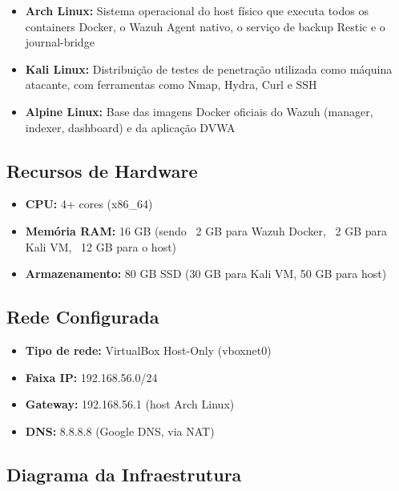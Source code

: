 \documentclass[12pt,a4paper]{article}
\begin{document}
    \begin{itemize}
        \item \textbf{Arch Linux:} Sistema operacional do host físico que executa todos os containers Docker, o Wazuh Agent nativo, o serviço de backup Restic e o journal-bridge
        \item \textbf{Kali Linux:} Distribuição de testes de penetração utilizada como máquina atacante, com ferramentas como Nmap, Hydra, Curl e SSH
        \item \textbf{Alpine Linux:} Base das imagens Docker oficiais do Wazuh (manager, indexer, dashboard) e da aplicação DVWA
    \end{itemize}

    \subsection{Recursos de Hardware}

    \begin{itemize}
        \item \textbf{CPU:} 4+ cores (x86\_64)
        \item \textbf{Memória RAM:} 16 GB (sendo ~2 GB para Wazuh Docker, ~2 GB para Kali VM, ~12 GB para o host)
        \item \textbf{Armazenamento:} 80 GB SSD (30 GB para Kali VM, 50 GB para host)
    \end{itemize}

    \subsection{Rede Configurada}

    \begin{itemize}
        \item \textbf{Tipo de rede:} VirtualBox Host-Only (vboxnet0)
        \item \textbf{Faixa IP:} 192.168.56.0/24
        \item \textbf{Gateway:} 192.168.56.1 (host Arch Linux)
        \item \textbf{DNS:} 8.8.8.8 (Google DNS, via NAT)
    \end{itemize}

    \subsection{Diagrama da Infraestrutura}
\end{document}
